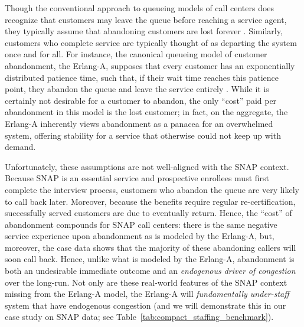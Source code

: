 \documentclass[manuscript,screen,authorversion]{acmart}
\begin{document}
Though the conventional approach to queueing models of call centers does recognize that customers may leave the queue before reaching a service agent, they typically assume that abandoning customers are lost forever \citep{gans2002telephone}. Similarly, customers who complete service are typically thought of as departing the system once and for all. 
For instance, the canonical queueing model of customer abandonment, the Erlang-A, supposes that every customer has an exponentially distributed patience time, such that, if their wait time reaches this patience point, they abandon the queue and leave the service entirely \citep{mandelbaum2005palm,mandelbaum2007service}. While it is certainly not desirable for a customer to abandon, the only ``cost'' paid per abandonment in this model is the lost customer; in fact, on the aggregate, the Erlang-A inherently views abandonment as a panacea for an overwhelmed system, offering stability for a service that otherwise could not keep up with demand. 

Unfortunately, these assumptions are not well-aligned with the SNAP context. Because SNAP is an essential service and prospective enrollees must first complete the interview process, customers who abandon the queue are very likely to call back later. Moreover, because the benefits require regular re-certification, successfully served customers are due to eventually return. Hence, the ``cost'' of abandonment compounds for SNAP call centers: there is the same negative service experience upon abandonment as is modeled by the Erlang-A, but, moreover, the case data shows that the majority of these abandoning callers will soon call back. Hence, unlike what is modeled by the Erlang-A,  abandonment is both an undesirable immediate outcome and an \emph{endogenous driver of congestion} over the long-run. Not only are these real-world features of the SNAP context missing from the Erlang-A model, the Erlang-A will \emph{fundamentally under-staff} system that have endogenous congestion (and we will demonstrate this in our case study on SNAP data; see Table~\ref{tab:compact_staffing_benchmark}). 
\end{document}
